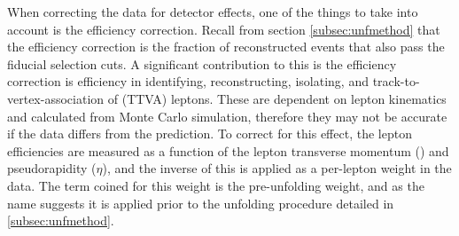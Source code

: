 When correcting the data for detector effects, one of the things to take into account is the efficiency correction. Recall from section \ref{subsec:unfmethod} that the efficiency correction is the fraction of reconstructed events that also pass the fiducial selection cuts. A significant contribution to this is the efficiency correction is efficiency in identifying, reconstructing, isolating, and track-to-vertex-association of (TTVA) leptons. These are dependent on lepton kinematics and calculated from Monte Carlo simulation, therefore they may not be accurate if the data differs from the prediction. To correct for this effect, the lepton efficiencies are measured as a function of the lepton transverse momentum (\pT) and pseudorapidity ($\eta$), and the inverse of this is applied as a per-lepton weight in the data. The term coined for this weight is the pre-unfolding weight, and as the name suggests it is applied prior to the unfolding procedure detailed in \ref{subsec:unfmethod}. 

